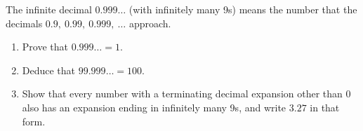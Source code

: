 The infinite decimal $0.999\ldots$ (with infinitely many 9s) means the number that the decimals $0.9,\ 0.99,\ 0.999,\ \dots$ approach.
\begin{enumerate}
\item[(a)] Prove that $0.999\ldots=1$.
\item[(b)] Deduce that $99.999\ldots=100$.
\item[(c)] Show that every number with a terminating decimal expansion other than $0$ also has an expansion ending in infinitely many 9s, and write $3.27$ in that form.
\end{enumerate}
